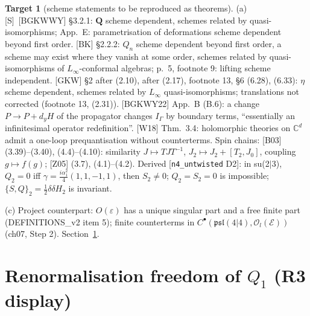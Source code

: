 \documentclass[11pt]{article}
\theoremstyle{definition}
\newtheorem{target}{Target}
\newcommand{\Sl}{\textup{[S]}}
\begin{document}
\begin{target}[scheme statements to be reproduced as theorems]\label{t:scheme}
(a) \Sl\ [BGKWWY] \S3.2.1: $\mathbf Q$ scheme dependent, schemes related by quasi-isomorphisms; App.~E: parametrisation of deformations scheme dependent beyond first order. [BK] \S2.2.2: $Q_n$ scheme dependent beyond first order, a scheme may exist where they vanish at some order, schemes related by quasi-isomorphisms of $L_\infty$-conformal algebras; p.~5, footnote 9: lifting scheme independent. [GKW] \S2 after (2.10), after (2.17), footnote 13, \S6 (6.28), (6.33): $\eta$ scheme dependent, schemes related by $L_\infty$ quasi-isomorphisms; translations not corrected (footnote 13, (2.31)). [BGKWY22] App.~B (B.6): a change $P\to P+d_yH$ of the propagator changes $I_\Gamma$ by boundary terms, ``essentially an infinitesimal operator redefinition''. [W18] Thm.~3.4: holomorphic theories on $\mathbb C^d$ admit a one-loop prequantisation without counterterms. Spin chains: [B03] (3.39)--(3.40), (4.4)--(4.10): similarity $J\mapsto TJT^{-1}$, $J_2\mapsto J_2+[T_2,J_0]$, coupling $g\mapsto f(g)$; [Z05] (3.7), (4.1)--(4.2). Derived [\texttt{n4\_untwisted} D2]: in su(2$|$3), $Q_2=0$ iff $\gamma=\frac{i\alpha_1^2}4(1,1,-1,1)$, then $S_2\neq0$; $Q_2=S_2=0$ is impossible; $\{S,Q\}_2=\frac12\delta\delta H_2$ is invariant.

(c) Project counterpart: $O(\varepsilon)$ has a unique singular part and a free finite part (DEFINITIONS\_v2 item 5); finite counterterms in $C^\bullet(\mathfrak{psl}(4|4),\mathscr O_l(\mathscr E))$ (ch07, Step 2). Section~\ref{sec:freedom}.
\end{target}

\section{Renormalisation freedom of $Q_1$ (R3 display)}\label{sec:freedom}
\end{document}
